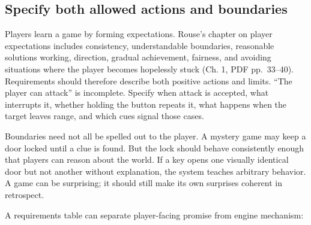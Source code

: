 \subsection{Specify both allowed actions and boundaries}\label{05-engine-i-ch009-specify-both-allowed-actions-and-boundaries}

\hypertarget{05-engine-i-ch009-specify-both-allowed-actions-and-boundaries}{}

Players learn a game by forming expectations. Rouse's chapter on player expectations includes consistency, understandable boundaries, reasonable solutions working, direction, gradual achievement, fairness, and avoiding situations where the player becomes hopelessly stuck (Ch. 1, PDF pp.~33--40). Requirements should therefore describe both positive actions and limits. ``The player can attack'' is incomplete. Specify when attack is accepted, what interrupts it, whether holding the button repeats it, what happens when the target leaves range, and which cues signal those cases.

Boundaries need not all be spelled out to the player. A mystery game may keep a door locked until a clue is found. But the lock should behave consistently enough that players can reason about the world. If a key opens one visually identical door but not another without explanation, the system teaches arbitrary behavior. A game can be surprising; it should still make its own surprises coherent in retrospect.

A requirements table can separate player-facing promise from engine mechanism:

